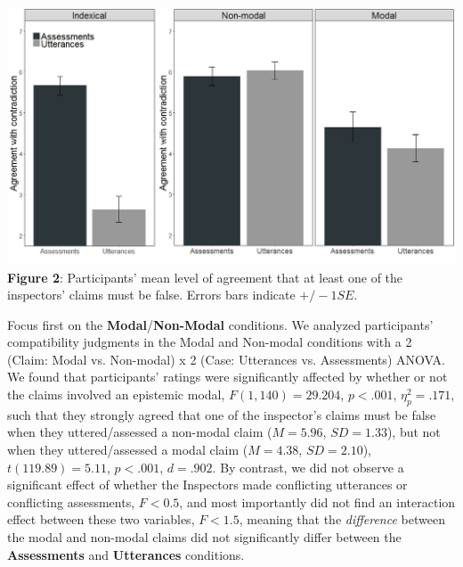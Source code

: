 \documentclass[11pt]{article}
\begin{document}
\begin{doublespace}
\vspace{.25cm}
\begin{center}
\includegraphics[width=5.5in]{fig2.jpg}\label{fig2}\\
{\bf Figure 2}: Participants' mean level of agreement that at least one of the inspectors' claims must be false. Errors bars indicate $+/- 1 SE$. \\
\end{center}

\noindent Focus first on the {\bf Modal}/{\bf Non-Modal} conditions. We analyzed participants' compatibility judgments in the Modal and Non-modal conditions with a 2 (Claim: Modal vs. Non-modal) x 2 (Case: Utterances vs. Assessments) ANOVA. We found that participants' ratings were significantly affected by whether or not the claims involved an epistemic modal, $F(1,140) = 29.204$, $p < .001$, $\eta_p^2 = .171$, such that they strongly agreed that one of the inspector's claims must be false when they uttered/assessed a non-modal claim ($M = 5.96$, $SD = 1.33$), but not when they uttered/assessed a modal claim ($M = 4.38$, $SD = 2.10$), $t(119.89) = 5.11$, $p < .001$, $d = .902$. By contrast, we did not observe a significant effect of whether the Inspectors made conflicting utterances or conflicting assessments, $F < 0.5$, and most importantly did not find an interaction effect between these two variables, $F < 1.5$, meaning that the \textit{difference} between the modal and non-modal claims did not significantly differ between the {\bf Assessments} and {\bf Utterances} conditions.


\end{doublespace}
\end{document}
